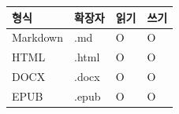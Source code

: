 \documentclass[11pt]{article}
\date{}
\begin{document}
\begin{table}[htbp]
\centering
\begin{tabular}{llll}
\toprule
형식 & 확장자 & 읽기 & 쓰기 \\
\midrule
Markdown & .md & O & O \\
HTML & .html & O & O \\
DOCX & .docx & O & O \\
EPUB & .epub & O & O \\
\bottomrule
\end{tabular}
\end{table}
\end{document}
